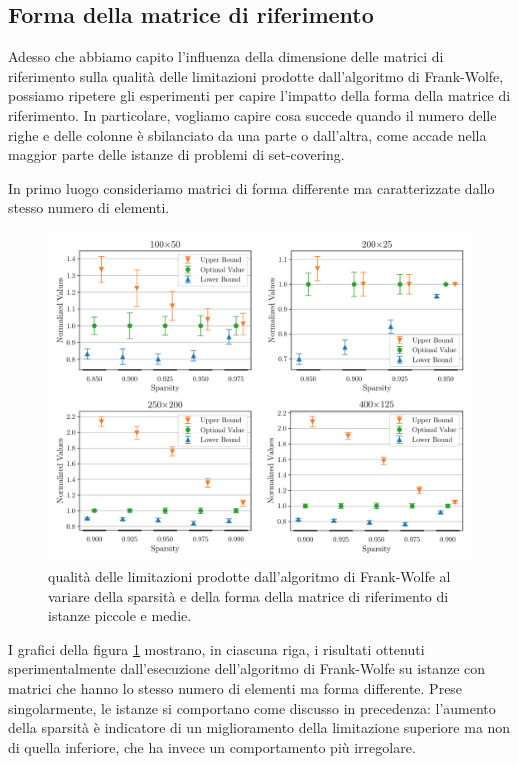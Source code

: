 \subsection{Forma della matrice di riferimento}
Adesso che abbiamo capito l’influenza della dimensione delle matrici di riferimento sulla qualità delle limitazioni
prodotte dall’algoritmo di Frank-Wolfe, possiamo ripetere gli esperimenti per capire l’impatto della forma della matrice
di riferimento. In particolare, vogliamo capire cosa succede quando il numero delle righe e delle colonne è sbilanciato
da una parte o dall’altra, come accade nella maggior parte delle istanze di problemi di set-covering.

In primo luogo consideriamo matrici di forma differente ma caratterizzate dallo stesso numero di elementi.

\begin{figure}[ht]
    \centering
    \includegraphics[width=\textwidth]{assets/figures/shape1.pdf}
    \caption{qualità delle limitazioni prodotte dall’algoritmo di Frank-Wolfe al variare della sparsità e della forma
    della matrice di riferimento di istanze piccole e medie.}
    \label{fig:shape1}
\end{figure}

\noindent
I grafici della figura \ref{fig:shape1} mostrano, in ciascuna riga, i risultati ottenuti sperimentalmente dall’esecuzione
dell’algoritmo di Frank-Wolfe su istanze con matrici che hanno lo stesso numero di elementi ma forma differente. Prese
singolarmente, le istanze si comportano come discusso in precedenza: l’aumento della sparsità è indicatore di un
miglioramento della limitazione superiore ma non di quella inferiore, che ha invece un comportamento più irregolare.

